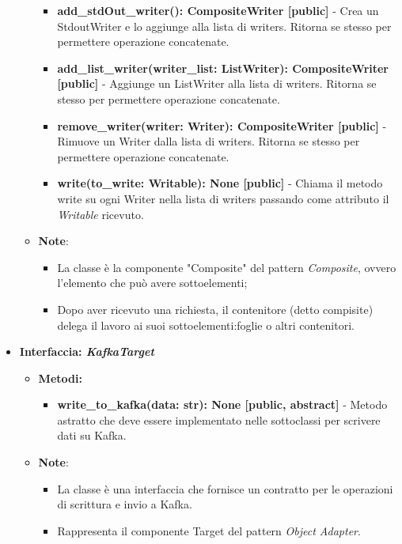 \begin{itemize}
\begin{itemize}
\begin{itemize}
        \item \textbf{add\_stdOut\_writer(): CompositeWriter [public]} - Crea un StdoutWriter e lo aggiunge alla lista di writers. Ritorna se stesso per permettere operazione concatenate.
        \item \textbf{add\_list\_writer(writer\_list: ListWriter): CompositeWriter [public]} - Aggiunge un ListWriter alla lista di writers. Ritorna se stesso per permettere operazione concatenate.
        \item \textbf{remove\_writer(writer: Writer): CompositeWriter [public]} - Rimuove un Writer dalla lista di writers.  Ritorna se stesso per permettere operazione concatenate.
        \item \textbf{write(to\_write: Writable): None [public]} - Chiama il metodo write su ogni Writer nella lista di writers passando come attributo il \textit{Writable} ricevuto.
    \end{itemize}
    \item\textbf{Note}:
        \begin{itemize}
            \item La classe è la componente "Composite" del pattern \textit{Composite}, ovvero l'elemento che può avere sottoelementi;
            \item Dopo aver ricevuto una richiesta, il contenitore (detto compisite) delega il lavoro ai suoi sottoelementi:foglie o altri contenitori.
        \end{itemize}
    \end{itemize}
    \item{\textbf{Interfaccia: \textit{KafkaTarget}}}
    \begin{itemize}
        \item \textbf{Metodi: }
        \begin{itemize}
            \item \textbf{write\_to\_kafka(data: str): None [public, abstract]} - Metodo astratto che deve essere implementato nelle sottoclassi per scrivere dati su Kafka.
        \end{itemize}
        \item\textbf{Note}:
        \begin{itemize}
            \item La classe è una interfaccia che fornisce un contratto per le operazioni di scrittura e invio a Kafka.
            \item Rappresenta il componente Target del pattern \textit{Object Adapter}.
        \end{itemize}

\end{itemize}
\end{itemize}

